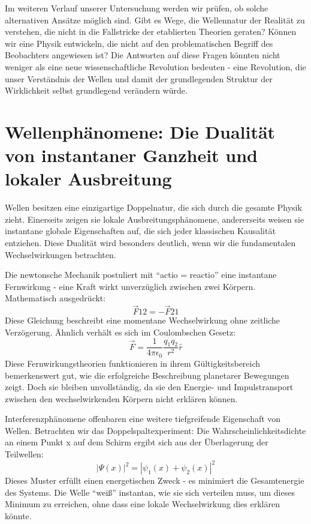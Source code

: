 Im weiteren Verlauf unserer Untersuchung werden wir prüfen, ob solche alternativen Ansätze möglich sind. Gibt es Wege, die Wellennatur der Realität zu verstehen, die nicht in die
Fallstricke der etablierten Theorien geraten? Können wir eine Physik entwickeln, die nicht auf den problematischen Begriff des Beobachters angewiesen ist? Die Antworten auf diese Fragen
könnten nicht weniger als eine neue wissenschaftliche Revolution bedeuten - eine Revolution, die unser Verständnis der Wellen und damit der grundlegenden Struktur der Wirklichkeit selbst
grundlegend verändern würde.

\section{Wellenphänomene: Die Dualität von instantaner Ganzheit und lokaler Ausbreitung}
Wellen besitzen eine einzigartige Doppelnatur, die sich durch die gesamte Physik zieht. Einerseits zeigen sie lokale Ausbreitungsphänomene, andererseits weisen sie instantane globale
Eigenschaften auf, die sich jeder klassischen Kausalität entziehen. Diese Dualität wird besonders deutlich, wenn wir die fundamentalen Wechselwirkungen betrachten.

Die newtonsche Mechanik postuliert mit \enquote{actio = reactio} eine instantane Fernwirkung - eine Kraft wirkt unverzüglich zwischen zwei Körpern. Mathematisch ausgedrückt:
\[
    \vec{F}{12} = -\vec{F}{21}
\]
Diese Gleichung beschreibt eine momentane Wechselwirkung ohne zeitliche Verzögerung. Ähnlich verhält es sich im Coulombschen Gesetz:
\[
    \vec{F} = \frac{1}{4\pi\epsilon_0}\frac{q_1q_2}{r^2}\hat{r}
\]
Diese Fernwirkungstheorien funktionieren in ihrem Gültigkeitsbereich bemerkenswert gut, wie die erfolgreiche Beschreibung planetarer Bewegungen zeigt. Doch sie bleiben unvollständig,
da sie den Energie- und Impulstransport zwischen den wechselwirkenden Körpern nicht erklären können.

Interferenzphänomene offenbaren eine weitere tiefgreifende Eigenschaft von Wellen. Betrachten wir das Doppelspaltexperiment: Die Wahrscheinlichkeitsdichte an einem Punkt x auf dem
Schirm ergibt sich aus der Überlagerung der Teilwellen:
\[
    |\Psi(x)|^2 = |\psi_1(x) + \psi_2(x)|^2
\]
Dieses Muster erfüllt einen energetischen Zweck - es minimiert die Gesamtenergie des Systems. Die Welle \enquote{weiß} instantan, wie sie sich verteilen muss, um dieses Minimum zu erreichen,
ohne dass eine lokale Wechselwirkung dies erklären könnte.

